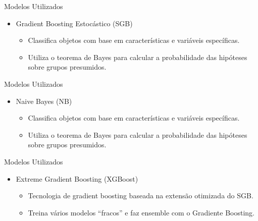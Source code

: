 \begin{frame}{Modelos Utilizados}
	\begin{itemize}
		\item Gradient Boosting Estocástico (SGB)
		\begin{itemize}
			\item Classifica objetos com base em características e variáveis específicas.
			\item Utiliza o teorema de Bayes para calcular a probabilidade das hipóteses sobre grupos presumidos.
		\end{itemize}
	\end{itemize}
\end{frame}

\begin{frame}{Modelos Utilizados}
	\begin{itemize}
		\item Naive Bayes (NB)
		\begin{itemize}
			\item Classifica objetos com base em características e variáveis específicas.
			\item Utiliza o teorema de Bayes para calcular a probabilidade das hipóteses sobre grupos presumidos.
		\end{itemize}
	\end{itemize}
\end{frame}

\begin{frame}{Modelos Utilizados}
	\begin{itemize}
		\item Extreme Gradient Boosting (XGBoost)
		\begin{itemize}
			\item Tecnologia de gradient boosting baseada na extensão otimizada do SGB.
			\item Treina vários modelos “fracos” e faz ensemble com o Gradiente Boosting.
		\end{itemize}
	\end{itemize}
\end{frame}

